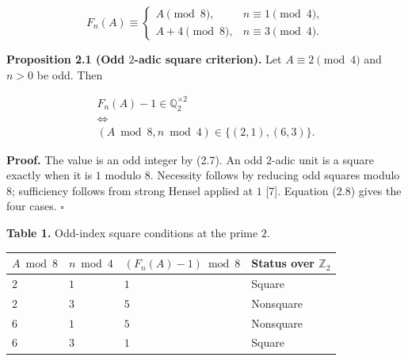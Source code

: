\documentclass[11pt,a4paper]{article}
\newcounter{none}
\begin{document}
\[
F_n(A)\equiv
\begin{cases}
A\pmod8,&n\equiv1\pmod4,\\
A+4\pmod8,&n\equiv3\pmod4.
\end{cases}
\tag{2.8}
\]

\protect{}\label{prop-two-adic}
\textbf{Proposition 2.1 (Odd \(2\)-adic square criterion).} Let
\(A\equiv2\pmod4\) and \(n>0\) be odd. Then

\[
\begin{gathered}
F_n(A)-1\in\mathbb Q_2^{\times2}\\
\Longleftrightarrow\\
(A\bmod8,n\bmod4)\in\{(2,1),(6,3)\}.
\end{gathered}
\tag{2.9}
\]

\textbf{Proof.} The value is an odd integer by (2.7). An odd \(2\)-adic
unit is a square exactly when it is \(1\) modulo \(8\). Necessity
follows by reducing odd squares modulo \(8\); sufficiency follows from
strong Hensel applied at \(1\) {[}7{]}. Equation (2.8) gives the four
cases. \(\square\)

\textbf{Table 1.} Odd-index square conditions at the prime \(2\).

{\def\LTcaptype{none} %
\begin{longtable}[]{@{}
  >{\centering\arraybackslash}p{}
  >{\centering\arraybackslash}p{}
  >{\centering\arraybackslash}p{}
  >{\raggedright\arraybackslash}p{}@{}}
\toprule\noalign{}
\begin{minipage}[b]{\linewidth}\centering
\(A\bmod8\)
\end{minipage} & \begin{minipage}[b]{\linewidth}\centering
\(n\bmod4\)
\end{minipage} & \begin{minipage}[b]{\linewidth}\centering
\((F_n(A)-1)\bmod8\)
\end{minipage} & \begin{minipage}[b]{\linewidth}\raggedright
Status over \(\mathbb Z_2\)
\end{minipage} \\
\midrule\noalign{}
\endhead
\bottomrule\noalign{}
\endlastfoot
\(2\) & \(1\) & \(1\) & Square \\
\(2\) & \(3\) & \(5\) & Nonsquare \\
\(6\) & \(1\) & \(5\) & Nonsquare \\
\(6\) & \(3\) & \(1\) & Square \\
\end{longtable}
}
\end{document}
